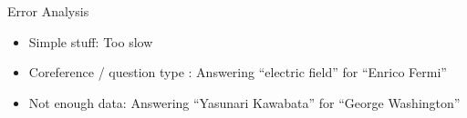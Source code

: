 \begin{frame}[t]
\begin{columns}
\begin{center}
		\end{center}
\end{columns}

\end{frame}

\else

\begin{frame}{Error Analysis}
  \begin{itemize}
    \item Simple stuff: Too slow
    \item Coreference \cite{haghighi-07} / question type \cite{moldovan-00}: Answering ``electric field'' for ``Enrico
      Fermi''
    \item Not enough data: Answering ``Yasunari Kawabata'' for ``George Washington''
  \end{itemize}
\end{frame}

\fi